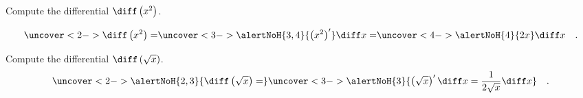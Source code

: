 \begin{frame}
\begin{example}
Compute the differential $\diff \left( x^2\right)$.

\[
\uncover<2->{\diff\left(x^2\right)=}\uncover<3->{ \alertNoH{3,4}{\left(x^2\right)'} \diff x=} \uncover<4->{\alertNoH{4}{2x} \diff x\quad .}
\]
\end{example}
\end{frame}
\begin{frame}
\begin{example}
Compute the differential $\diff  \left(\sqrt{x}\right)$.
\[
\uncover<2->{\alertNoH{2,3}{\diff \left(\sqrt{x}\right)=} }\uncover<3->{ \alertNoH{3}{ \left(\sqrt{x}\right)'\diff  x=  \frac{1}{2\sqrt{x}} \diff x }\quad .}
\]
\end{example}
\end{frame}

